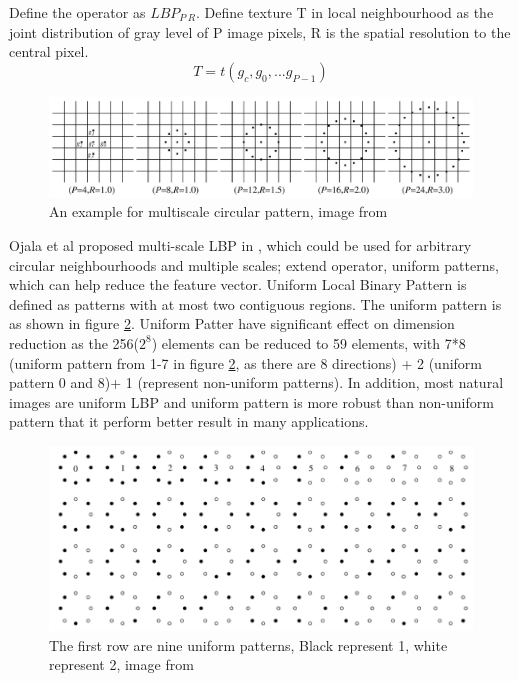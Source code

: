 \newline
Define the operator as $LBP_{P\ R}$. Define texture T in local neighbourhood as the joint distribution of gray level of P image pixels, R is the spatial resolution to the central pixel.
\begin{equation}
T = t(g_{c},g_{0},...g_{P-1})
\label{eq:LBPDT}
\end{equation}
\begin{figure}[ht]
\centering
\captionsetup{justification=centering,margin=1cm}
\includegraphics[width = \textwidth]{imgs/LBP_Example_3.png}
\caption{An example for multiscale circular pattern, image from \cite{ojala2002multiresolution}}
\label{fig:LBPE03}
\end{figure}

Ojala et al proposed multi-scale LBP in \cite{ojala2002multiresolution}, which could be used for arbitrary circular neighbourhoods and multiple scales; extend operator, uniform patterns, which can help reduce the feature vector. Uniform Local Binary Pattern is defined as patterns with at most two contiguous regions. The uniform pattern is as shown in figure \ref{fig:LBPE04}. Uniform Patter have significant effect on dimension reduction as the 256($2^8$) elements can be reduced to 59 elements, with 7*8 (uniform pattern from 1-7 in figure \ref{fig:LBPE04}, as there are 8 directions) + 2 (uniform pattern 0 and 8)+ 1 (represent non-uniform patterns). In addition, most natural images are uniform LBP and uniform pattern is more robust than non-uniform pattern that it perform better result in many applications.
\begin{figure}[ht]
\centering
\captionsetup{justification=centering,margin=1cm}
\includegraphics[width = \textwidth]{imgs/LBP_Example_4.png}
\caption{The first row are nine uniform patterns, Black represent 1, white represent 2, image from \cite{ojala2002multiresolution}}
\label{fig:LBPE04}
\end{figure}
\newpage
